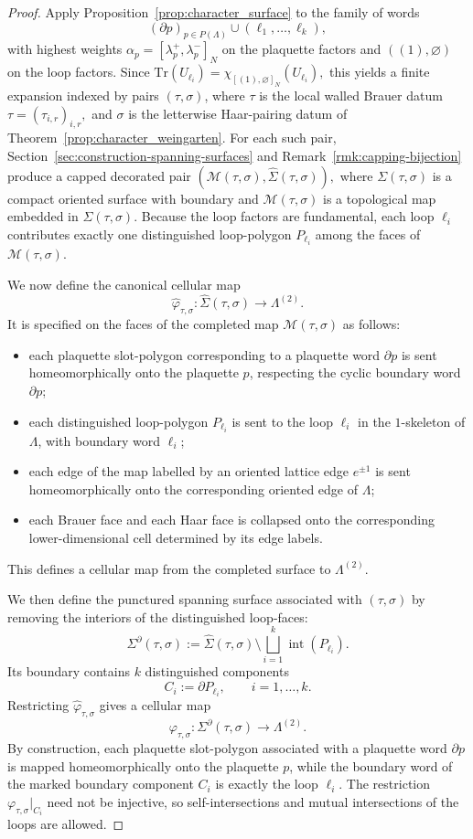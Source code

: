 \documentclass[11pt,a4paper,reqno]{article}
\theoremstyle{definition}
\theoremstyle{remark}
\newcommand\Tr{\mathrm{Tr}}
\newcommand\M{{\mathcal{M}}}
\begin{document}
\begin{proof}
Apply Proposition~\ref{prop:character_surface} to the family of words
\[
(\partial p)_{p\in P(\Lambda)}\cup (\ell_1,\dots,\ell_k),
\]
with highest weights $\alpha_p=[\lambda_p^+,\lambda_p^-]_N$ on the plaquette factors and
$((1),\varnothing)$ on the loop factors. Since $\Tr(U_{\ell_i})=\chi_{[(1),\varnothing]_N}(U_{\ell_i}),$ this yields a finite expansion indexed by pairs $(\tau,\sigma)$, where $\tau$ is the local walled Brauer datum $\tau=(\tau_{i,r})_{i,r},$ and $\sigma$ is the letterwise Haar-pairing datum of Theorem~\ref{prop:character_weingarten}. For each such pair, Section~\ref{sec:construction-spanning-surfaces} and Remark~\ref{rmk:capping-bijection} produce a capped decorated pair $(\M(\tau,\sigma), \widehat\Sigma(\tau,\sigma)),$ where $\Sigma(\tau,\sigma)$ is a compact oriented surface with boundary and $\M(\tau,\sigma)$ is a topological map embedded in $\Sigma(\tau,\sigma)$. Because the loop factors are fundamental, each loop $\ell_i$ contributes exactly one distinguished
loop-polygon $P_{\ell_i}$ among the faces of $\M(\tau,\sigma)$.

We now define the canonical cellular map
\[
\widehat\varphi_{\tau,\sigma}:\widehat\Sigma(\tau,\sigma)\longrightarrow \Lambda^{(2)}.
\]
It is specified on the faces of the completed map $\M(\tau,\sigma)$ as follows:
\begin{itemize}
\item each plaquette slot-polygon corresponding to a plaquette word $\partial p$ is sent homeomorphically onto the plaquette $p$, respecting the cyclic boundary word $\partial p$;
\item each distinguished loop-polygon $P_{\ell_i}$ is sent to the loop $\ell_i$ in the $1$-skeleton of $\Lambda$, with boundary word $\ell_i$;
\item each edge of the map labelled by an oriented lattice edge $e^{\pm1}$ is sent homeomorphically onto the corresponding oriented edge of $\Lambda$;
\item each Brauer face and each Haar face is collapsed onto the corresponding lower-dimensional cell determined by its edge labels.
\end{itemize}
This defines a cellular map from the completed surface to $\Lambda^{(2)}$.

We then define the punctured spanning surface associated with $(\tau,\sigma)$ by removing the interiors of the distinguished loop-faces:
\[
\Sigma^\partial(\tau,\sigma):=\widehat\Sigma(\tau,\sigma)\setminus \bigsqcup_{i=1}^k \operatorname{int}(P_{\ell_i}).
\]
Its boundary contains $k$ distinguished components
\[
C_i:=\partial P_{\ell_i},\qquad i=1,\dots,k.
\]
Restricting $\widehat\varphi_{\tau,\sigma}$ gives a cellular map
\[
\varphi_{\tau,\sigma}:\Sigma^\partial(\tau,\sigma)\to \Lambda^{(2)}.
\]
By construction, each plaquette slot-polygon associated with a plaquette word $\partial p$ is mapped homeomorphically onto the plaquette $p$, while the boundary word of the marked boundary component $C_i$ is exactly the loop $\ell_i$. The restriction $\varphi_{\tau,\sigma}|_{C_i}$ need not be injective, so self-intersections and mutual intersections of the loops are allowed.


\end{proof}
\end{document}
